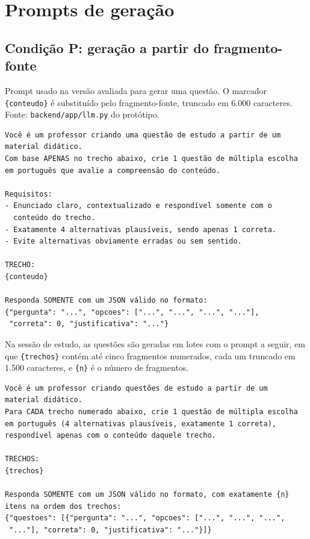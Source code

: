 \chapter{\label{ap:prompts}Prompts de geração}

\section{Condição P: geração a partir do fragmento-fonte}

Prompt usado na versão avaliada para gerar uma questão. O marcador \texttt{\{conteudo\}} é substituído pelo fragmento-fonte, truncado em 6.000 caracteres. Fonte: \texttt{backend/app/llm.py} do protótipo.

\begin{small}
\begin{verbatim}
Você é um professor criando uma questão de estudo a partir de um
material didático.
Com base APENAS no trecho abaixo, crie 1 questão de múltipla escolha
em português que avalie a compreensão do conteúdo.

Requisitos:
- Enunciado claro, contextualizado e respondível somente com o
  conteúdo do trecho.
- Exatamente 4 alternativas plausíveis, sendo apenas 1 correta.
- Evite alternativas obviamente erradas ou sem sentido.

TRECHO:
{conteudo}

Responda SOMENTE com um JSON válido no formato:
{"pergunta": "...", "opcoes": ["...", "...", "...", "..."],
 "correta": 0, "justificativa": "..."}
\end{verbatim}
\end{small}

Na sessão de estudo, as questões são geradas em lotes com o prompt a seguir, em que \texttt{\{trechos\}} contém até cinco fragmentos numerados, cada um truncado em 1.500 caracteres, e \texttt{\{n\}} é o número de fragmentos.

\begin{small}
\begin{verbatim}
Você é um professor criando questões de estudo a partir de um
material didático.
Para CADA trecho numerado abaixo, crie 1 questão de múltipla escolha
em português (4 alternativas plausíveis, exatamente 1 correta),
respondível apenas com o conteúdo daquele trecho.

TRECHOS:
{trechos}

Responda SOMENTE com um JSON válido no formato, com exatamente {n}
itens na ordem dos trechos:
{"questoes": [{"pergunta": "...", "opcoes": ["...", "...", "...",
 "..."], "correta": 0, "justificativa": "..."}]}
\end{verbatim}
\end{small}

